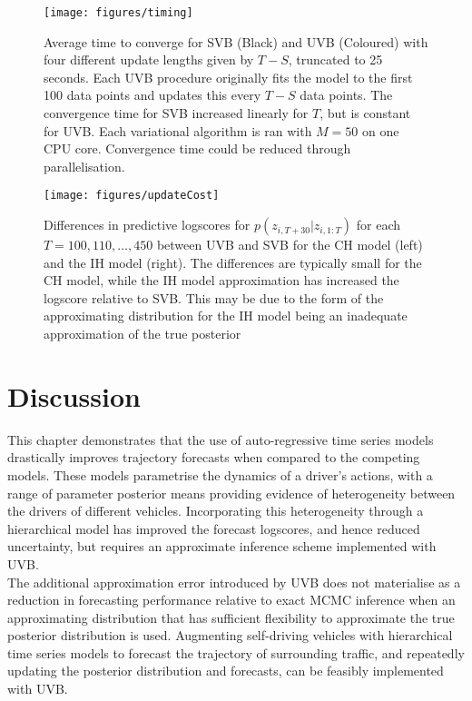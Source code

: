\documentclass[
12pt, %
onehalfspacing, %
nohyperref, %
headsepline, %
chapterinoneline, %
]{MastersDoctoralThesis} %
\begin{document}
\begin{figure}[htbp]
\centering
\texttt{[image: figures/timing]}
\caption{Average time to converge for SVB (Black) and UVB (Coloured) with four different update lengths given by $T - S$, truncated to 25 seconds. Each UVB procedure originally fits the model to the first 100 data points and updates this every $T - S$ data points. The convergence time for SVB increased linearly for $T$, but is constant for UVB. Each variational algorithm is ran with $M = 50$ on one CPU core. Convergence time could be reduced through parallelisation.}
\label{fig:carstiming}
\end{figure}
\begin{figure}[htbp]
\centering
\texttt{[image: figures/updateCost]}
\caption{Differences in predictive logscores for $p(z_{i, T+30} | z_{i, 1:T})$ for each $T = 100, 110, \ldots, 450$ between UVB and SVB for the CH model (left) and the IH model (right). The differences are typically small for the CH model, while the IH model approximation has increased the logscore relative to SVB. This may be due to the form of the approximating distribution for the IH model being an inadequate approximation of the true posterior}
\label{fig:carsupdateCost}
\end{figure}

\section{Discussion}
\label{sec:carsdisc}
This chapter demonstrates that the use of auto-regressive time series models drastically improves trajectory forecasts when compared to the competing models.  These models parametrise the dynamics of a driver's actions, with a range of parameter posterior means providing evidence of heterogeneity between the drivers of different vehicles. Incorporating this heterogeneity through a hierarchical model has improved the forecast logscores, and hence reduced uncertainty, but requires an approximate inference scheme implemented with UVB. 
\\

The additional approximation error introduced by UVB does not materialise as a reduction in forecasting performance relative to exact MCMC inference when an approximating distribution that has sufficient flexibility to approximate the true posterior distribution is used. Augmenting self-driving vehicles with hierarchical time series models to forecast the trajectory of surrounding traffic, and repeatedly updating the posterior distribution and forecasts, can be feasibly implemented with UVB.
\\
\end{document}
